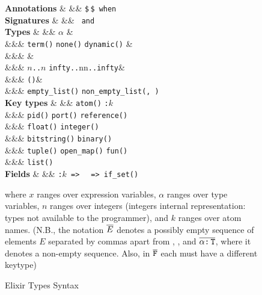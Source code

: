 \begin{figure} [H]
   \begin{grammarfig}
      \textbf{Annotations} & \ETA &\bnfeq& 
      \texttt{\$}\,\ETS \bnfor \texttt{\$}\,\ETS\,\,\texttt{when}\,\,\ov{\texttt{$\alpha$:}\,\ETT}
      \\
      \textbf{Signatures} & \ETS &\bnfeq& 
      \ETFn{\ETT} \bnfor \texttt{\ETS\,and\,\ETS}
      \\[2mm]
      \textbf{Types} & \ETT &\bnfeq&
      \texttt{$\alpha$} & 
      \\ &&\bnfor& \ETK \bnfor \texttt{term()} \bnfor \texttt{none()} \bnfor \texttt{dynamic()} &
      \\ &&\bnfor& \gor{\ETT}{\ETT} \bnfor \gand{\ETT}{\ETT} \bnfor \gnot{\ETT} & 
      \\ &&\bnfor& \texttt{$n$..$n$} \bnfor \texttt{infty..}n\bnfor n\texttt{..infty}& 
      \\ &&\bnfor& \tuple{\ov{\ETT}} \bnfor {} \bnfor \map{\ov{\ETF}} \bnfor {}\bnfor\texttt{(\fun{$\ov{\ETT}$}{\ETT})}& 
      \\ &&\bnfor& \texttt{empty\_list()} \bnfor \texttt{non\_empty\_list(\ETT, \ETT)}
      \\
      \textbf{Key types} & \ETK &\bnfeq&
      \texttt{atom()} \bnfor \texttt{:$k$}
      \\ &&\bnfor& \texttt{pid()} \bnfor \texttt{port()} \bnfor \texttt{reference()}
      \\ &&\bnfor& \texttt{float()} \bnfor \texttt{integer()}
      \\ &&\bnfor& \texttt{bitstring()} \bnfor \texttt{binary()}
      \\ &&\bnfor& \texttt{tuple()} \bnfor \texttt{open\_map()} \bnfor \texttt{fun()}
      \\ &&\bnfor& \texttt{list()}
      \\
      \textbf{Fields} & \ETF &\bnfeq&
      \texttt{:$k$\,=>\,\ETT} \bnfor \texttt{\ETK\,=>\,if\_set(\ETT)}
   \end{grammarfig}
   \noindent
   where $x$ ranges over expression variables, $\alpha$ ranges over type variables, 
   $n$ ranges over integers (integers internal representation: types not available to the programmer), and $k$ ranges over atom names. (N.B., the notation $\overline{E}$ denotes a possibly empty sequence of elements $E$ separated by commas apart from , , and $\overline{\alpha\texttt{:}\,\texttt{T}}$, where it denotes a non-empty sequence. Also, in $\overline{\texttt{F}}$ each \ETF{} must have a different keytype)
   \caption{Elixir Types Syntax}
   \label{app:elixir-types-syntax}
\end{figure}
